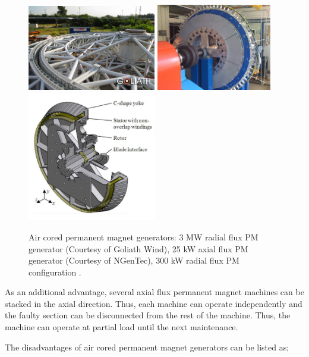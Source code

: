 \documentclass[a4paper, 11pt]{article} %
\begin{document}
  \begin{figure}[t]
    \centering
    \includegraphics[width=0.5\textwidth]{goliath}
    \includegraphics[width=0.45\textwidth]{25kw_cgen}
    \includegraphics[width=0.5\textwidth]{c-core_kamper}
    \caption{Air cored permanent magnet generators: 3 MW radial flux PM generator (Courtesy of Goliath Wind), 25 kW axial flux PM generator (Courtesy of NGenTec), 300 kW radial flux PM configuration \cite{Wijk2010}.} 
    \label{air_cored}
  \end{figure}

As an additional advantage, several axial flux permanent magnet machines can be stacked in the axial direction. Thus, each machine can operate independently and the faulty section can be disconnected from the rest of the machine. Thus, the machine can operate at partial load until the next maintenance. 

The disadvantages of air cored permanent magnet generators can be listed as;
\end{document}
